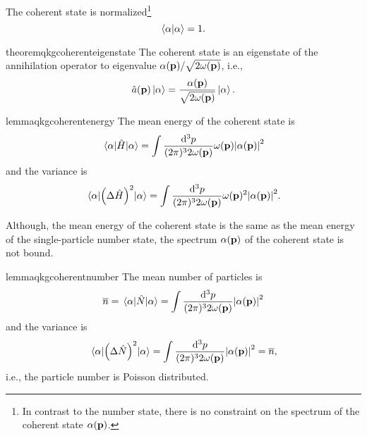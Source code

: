 \begin{corollary}
	The coherent state is normalized\footnote{In contrast to the number state, there is no constraint on the spectrum of the coherent state $\alpha(\vb{p})$.}
	\begin{equation}
		\braket{\alpha}
		=
		1
		.
	\end{equation}
\end{corollary}
\begin{restatable}{theorem}{qkgcoherenteigenstate}\label{thm:qkg_coherent_state_eigenstate}
	The coherent state is an eigenstate of the annihilation operator to eigenvalue $\alpha(\vb{p})/\sqrt{2\omega(\vb{p})}$, i.e.,
	\begin{equation}\label{eq:qkg_coherent_state_eigenstate}
		\hat{a}(\vb{p})
		\ket{\alpha}
		=
		\frac{\alpha(\vb{p})}{\sqrt{2\omega(\vb{p})}}
		\ket{\alpha}
		.
	\end{equation}
\end{restatable}
\begin{restatable}{lemma}{qkgcoherentenergy}\label{thm:qkg_coherent_state_energy}
	The mean energy of the coherent state is
	\begin{equation}
		\expval{\hat{H}}{\alpha}
		=
		\int\frac{\dd[3]{p}}{(2\pi)^32\omega(\vb{p})}
		\omega(\vb{p})
		\abs{\alpha(\vb{p})}^2
	\end{equation}
	and the variance is
	\begin{equation}
		\expval{\left(\Delta\hat{H}\right)^2}{\alpha}
		=
		\int\frac{\dd[3]{p}}{(2\pi)^32\omega(\vb{p})}
		\omega(\vb{p})^2
		\abs{\alpha(\vb{p})}^2
		.
	\end{equation}
\end{restatable}
Although, the mean energy of the coherent state is the same as the mean energy of the single-particle number state, the spectrum $\alpha(\vb{p})$ of the coherent state is not bound.
\begin{restatable}{lemma}{qkgcoherentnumber}\label{thm:qkg_coherent_state_number}
	The mean number of particles is
	\begin{equation}
		\overline{n}
		=
		\expval{\hat{N}}{\alpha}
		=
		\int\frac{\dd[3]{p}}{(2\pi)^32\omega(\vb{p})}
		\abs{\alpha(\vb{p})}^2
	\end{equation}
	and the variance is
	\begin{equation}
		\expval{\left(\Delta\hat{N}\right)^2}{\alpha}
		=
		\int\frac{\dd[3]{p}}{(2\pi)^32\omega(\vb{p})}
		\abs{\alpha(\vb{p})}^2
		=
		\overline{n}
		,
	\end{equation}
	i.e., the particle number is Poisson distributed.
\end{restatable}
